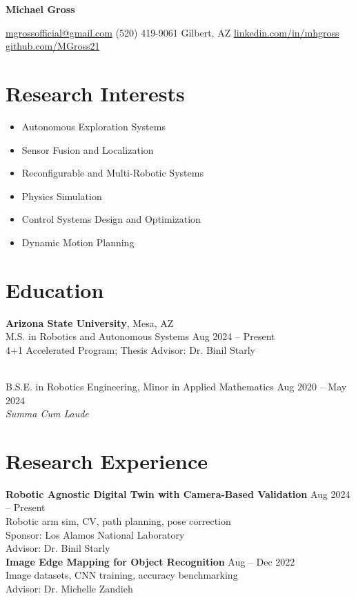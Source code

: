 \documentclass[10pt]{article}
\begin{document}
\centerline{\LARGE\textbf{Michael Gross}}
\centerline{\href{mailto:mgrossofficial@gmail.com}{mgrossofficial@gmail.com} \textbar{} (520) 419-9061 \textbar{} Gilbert, AZ \textbar{} \href{https://www.linkedin.com/in/mhgross}{linkedin.com/in/mhgross} \textbar{} \href{https://github.com/MGross21}{github.com/MGross21}}

\vspace{-0.5em}
\section*{Research Interests}
\vspace{-0.7em}
\begin{multicols}{2}
  \begin{itemize}[leftmargin=1.2em]
    \item Autonomous Exploration Systems
    \item Sensor Fusion and Localization
    \item Reconfigurable and Multi-Robotic Systems
    \item Physics Simulation
    \item Control Systems Design and Optimization
    \item Dynamic Motion Planning
  \end{itemize}
\end{multicols}
\vspace{-0.7em}

\section*{Education}
\textbf{Arizona State University}, Mesa, AZ\\
M.S. in Robotics and Autonomous Systems \hfill Aug 2024 -- Present\\
4+1 Accelerated Program; Thesis Advisor: Dr. Binil Starly

\\[0.5em]
B.S.E. in Robotics Engineering, Minor in Applied Mathematics \hfill Aug 2020 -- May 2024\\
\textit{Summa Cum Laude}

\section*{Research Experience}
\textbf{Robotic Agnostic Digital Twin with Camera-Based Validation} \hfill Aug 2024 -- Present\\
\hspace*{2em}Robotic arm sim, CV, path planning, pose correction\\
\hspace*{2em}Sponsor: Los Alamos National Laboratory\\
\hspace*{2em}Advisor: Dr. Binil Starly \\
\textbf{Image Edge Mapping for Object Recognition} \hfill Aug -- Dec 2022\\
\hspace*{2em}Image datasets, CNN training, accuracy benchmarking\\Advisor: Dr. Michelle Zandieh
\end{document}
